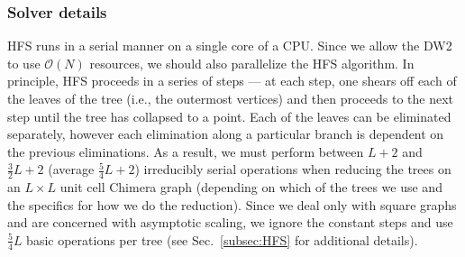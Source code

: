 \subsubsection{Solver details}
HFS runs in a  serial manner on a single core of a CPU. Since we allow the DW2 to use $\mathcal{O} (N)$ resources, we should also parallelize the HFS algorithm. In principle, HFS proceeds in a series of steps --- at each step, one shears off each of the leaves of the tree (i.e., the outermost vertices) and then proceeds to the next step until the tree has collapsed to a point. Each of the leaves can be eliminated separately, however each elimination along a particular branch is dependent on the previous eliminations. As a result, we must perform between $L+2$ and $\frac32 L+2$ (average $\frac54 L+2$) irreducibly serial operations when reducing the trees on an $L\times L$ unit cell Chimera graph (depending on which of the trees we use and the specifics for how we do the reduction). Since we deal only with square graphs and are concerned with asymptotic scaling, we ignore the constant steps and use $\frac54 L$ basic operations per tree (see Sec.~\ref{subsec:HFS} for additional details).

